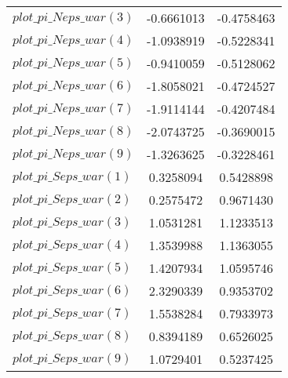 \begin{center}
\begin{longtable}{lcc}
$plot\_pi\_N eps\_war (3)   $	 & 	     -0.6661013	 & 	     -0.4758463 \\ 
$plot\_pi\_N eps\_war (4)   $	 & 	     -1.0938919	 & 	     -0.5228341 \\ 
$plot\_pi\_N eps\_war (5)   $	 & 	     -0.9410059	 & 	     -0.5128062 \\ 
$plot\_pi\_N eps\_war (6)   $	 & 	     -1.8058021	 & 	     -0.4724527 \\ 
$plot\_pi\_N eps\_war (7)   $	 & 	     -1.9114144	 & 	     -0.4207484 \\ 
$plot\_pi\_N eps\_war (8)   $	 & 	     -2.0743725	 & 	     -0.3690015 \\ 
$plot\_pi\_N eps\_war (9)   $	 & 	     -1.3263625	 & 	     -0.3228461 \\ 
$plot\_pi\_S eps\_war (1)   $	 & 	      0.3258094	 & 	      0.5428898 \\ 
$plot\_pi\_S eps\_war (2)   $	 & 	      0.2575472	 & 	      0.9671430 \\ 
$plot\_pi\_S eps\_war (3)   $	 & 	      1.0531281	 & 	      1.1233513 \\ 
$plot\_pi\_S eps\_war (4)   $	 & 	      1.3539988	 & 	      1.1363055 \\ 
$plot\_pi\_S eps\_war (5)   $	 & 	      1.4207934	 & 	      1.0595746 \\ 
$plot\_pi\_S eps\_war (6)   $	 & 	      2.3290339	 & 	      0.9353702 \\ 
$plot\_pi\_S eps\_war (7)   $	 & 	      1.5538284	 & 	      0.7933973 \\ 
$plot\_pi\_S eps\_war (8)   $	 & 	      0.8394189	 & 	      0.6526025 \\ 
$plot\_pi\_S eps\_war (9)   $	 & 	      1.0729401	 & 	      0.5237425 \\ 
\end{longtable}
 \end{center}
